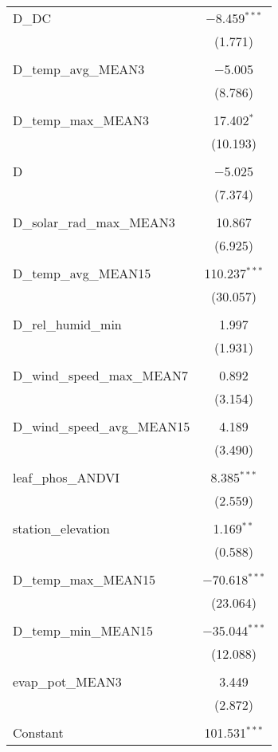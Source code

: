 \begin{table}[!htbp]
\begin{tabular}{@{\extracolsep{5pt}}lc}
 D\_DC & $-$8.459$^{***}$ \\ 
  & (1.771) \\ 
  & \\ 
 D\_temp\_avg\_MEAN3 & $-$5.005 \\ 
  & (8.786) \\ 
  & \\ 
 D\_temp\_max\_MEAN3 & 17.402$^{*}$ \\ 
  & (10.193) \\ 
  & \\ 
 D & $-$5.025 \\ 
  & (7.374) \\ 
  & \\ 
 D\_solar\_rad\_max\_MEAN3 & 10.867 \\ 
  & (6.925) \\ 
  & \\ 
 D\_temp\_avg\_MEAN15 & 110.237$^{***}$ \\ 
  & (30.057) \\ 
  & \\ 
 D\_rel\_humid\_min & 1.997 \\ 
  & (1.931) \\ 
  & \\ 
 D\_wind\_speed\_max\_MEAN7 & 0.892 \\ 
  & (3.154) \\ 
  & \\ 
 D\_wind\_speed\_avg\_MEAN15 & 4.189 \\ 
  & (3.490) \\ 
  & \\ 
 leaf\_phos\_ANDVI & 8.385$^{***}$ \\ 
  & (2.559) \\ 
  & \\ 
 station\_elevation & 1.169$^{**}$ \\ 
  & (0.588) \\ 
  & \\ 
 D\_temp\_max\_MEAN15 & $-$70.618$^{***}$ \\ 
  & (23.064) \\ 
  & \\ 
 D\_temp\_min\_MEAN15 & $-$35.044$^{***}$ \\ 
  & (12.088) \\ 
  & \\ 
 evap\_pot\_MEAN3 & 3.449 \\ 
  & (2.872) \\ 
  & \\ 
 Constant & 101.531$^{***}$ \\ 

\end{tabular}
\end{table}
